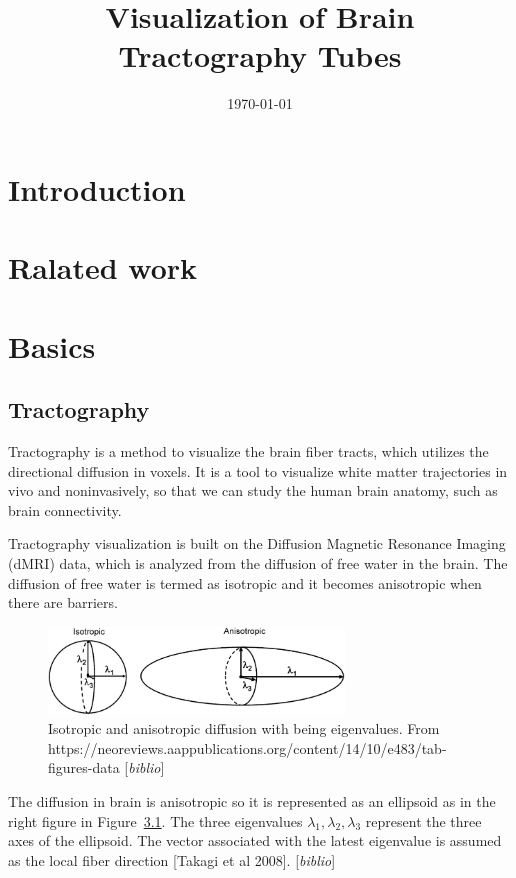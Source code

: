 \documentclass[a4paper, 12pt]{report}
\title{Visualization of Brain Tractography Tubes}
\date{\today}
\newcommand{\comment}[1]{{\color{red}[\textit{#1}]}}
\begin{document}
\maketitle
\tableofcontents
\chapter{Introduction}
\chapter{Ralated work}
\chapter{Basics}

\section{Tractography}
Tractography is a method to visualize the brain fiber tracts, which utilizes the directional diffusion in voxels. It is a tool to visualize white matter trajectories in vivo and noninvasively, so that we can study the human brain anatomy, such as brain connectivity.

Tractography visualization is built on the Diffusion Magnetic Resonance Imaging (dMRI) data, which is analyzed from the diffusion of free water in the brain. The diffusion of free water is termed as isotropic and it becomes anisotropic when there are barriers. 

\begin{figure}[h]
	\centering
	\includegraphics[width=0.7\textwidth]{iso_ani_diff}
	\caption{Isotropic and anisotropic diffusion with  being eigenvalues. From
https://neoreviews.aappublications.org/content/14/10/e483/tab-figures-data \comment{biblio}}
	\label{fig:iso_ani_diff}
\end{figure}

The diffusion in brain is anisotropic so it is represented as an ellipsoid as in the right figure in Figure~\ref{fig:iso_ani_diff}. The three eigenvalues  $\lambda_1, \lambda_2, \lambda_3$ represent the three axes of the ellipsoid. The vector associated with the latest eigenvalue is assumed as the local fiber direction [Takagi et al 2008]. \comment{biblio}
\end{document}
